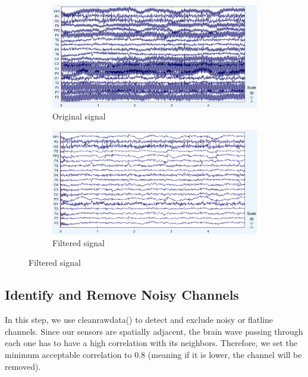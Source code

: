 \documentclass[hidelinks,12pt]{article}
\begin{document}
	\begin{figure}[!h]
		\centering
		\begin{subfigure}{0.45\textwidth}
			\centering
			\includegraphics[height=0.52\linewidth]{7}
			\caption{Original signal}
		\end{subfigure}
		\hfill
		\begin{subfigure}{0.45\textwidth}
			\centering
			\includegraphics[height=0.52\linewidth]{8}
			\caption{Filtered signal}
		\end{subfigure}
	\end{figure}
	
	\newpage
	
	
	\subsection{Identify and Remove Noisy Channels}
		In this step, we use clean\textunderscore rawdata() to detect and exclude noisy or flatline channels. Since our sensors are spatially adjacent, the brain wave passing through each one has to have a high correlation with its neighbors. Therefore, we set the minimum acceptable correlation to 0.8 (meaning if it is lower, the channel will be removed).
\end{document}
